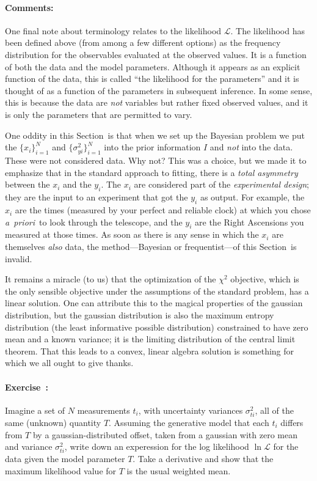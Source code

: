 \documentclass[12pt,twoside]{article}
\newcommand{\notenglish}[1]{\textsl{#1}}
\newcommand{\apriori}{\notenglish{a~priori}}
\newcommand{\sectionname}{Section}
\newcommand{\problemname}{Exercise}
\newcommand{\commentsname}{Comments}
\newcounter{problem}
\newenvironment{problem}{\paragraph{\problemname~\theproblem:}\refstepcounter{problem}}{}
\newenvironment{comments}{\paragraph{\commentsname:}}{}
\newcommand{\setofall}[3]{\{{#1}\}_{{#2}}^{{#3}}}
\newcommand{\allx}{\setofall{x_i}{i=1}{N}}
\newcommand{\allsigmay}{\setofall{\sigma_{yi}^2}{i=1}{N}}
\newcommand{\like}{\mathscr{L}}
\begin{document}
\begin{comments}
One final note about terminology relates to the likelihood $\like$.
The likelihood has been defined above (from among a few different
options) as the frequency distribution for the observables evaluated
at the observed values.  It is a function of both the data and the
model parameters.  Although it appears as an explicit function of the
data, this is called ``the likelihood for the parameters'' and it is
thought of as a function of the parameters in subsequent inference.
In some sense, this is because the data are \emph{not} variables but
rather fixed observed values, and it is only the parameters that are
permitted to vary.

One oddity in this \sectionname\ is that when we set up the Bayesian
problem we put the $\allx$ and $\allsigmay$ into the prior information
$I$ and \emph{not} into the data.  These were not considered data.
Why not?  This was a choice, but we made it to emphasize that in the
standard approach to fitting, there is a \emph{total asymmetry}
between the $x_i$ and the $y_i$.  The $x_i$ are considered part of the
\emph{experimental design}; they are the input to an experiment that
got the $y_i$ as output.  For example, the $x_i$ are the times
(measured by your perfect and reliable clock) at which you chose
\apriori\ to look through the telescope, and the $y_i$ are the Right
Ascensions you measured at those times.  As soon as there is any sense
in which the $x_i$ are themselves \emph{also} data, the
method---Bayesian or frequentist---of this \sectionname\ is invalid.

It remains a miracle (to us) that the optimization of the $\chi^2$
objective, which is the only sensible objective under the assumptions
of the standard problem, has a linear solution.  One can attribute
this to the magical properties of the gaussian distribution, but the
gaussian distribution is also the maximum entropy distribution (the
least informative possible distribution) constrained to have zero mean
and a known variance; it is the limiting distribution of the central
limit theorem.  That this leads to a convex, linear algebra solution
is something for which we all ought to give thanks.
\end{comments}

\begin{problem}
Imagine a set of $N$ measurements $t_i$, with uncertainty variances
$\sigma_{ti}^2$, all of the same (unknown) quantity $T$.  Assuming the
generative model that each $t_i$ differs from $T$ by a
gaussian-distributed offset, taken from a gaussian with zero mean and
variance $\sigma_{ti}^2$, write down an experession for the log
likelihood $\ln\like$ for the data given the model parameter $T$.
Take a derivative and show that the maximum likelihood value for $T$
is the usual weighted mean.
\end{problem}
\end{document}

